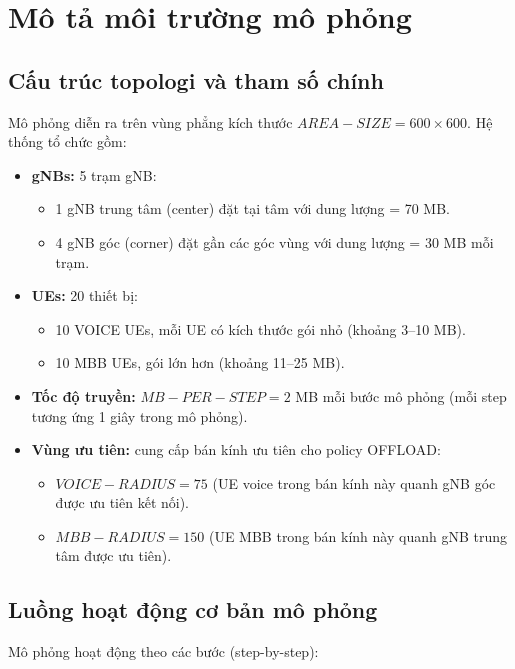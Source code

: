 \section{Mô tả môi trường mô phỏng}

\subsection{Cấu trúc topologi và tham số chính}

Mô phỏng diễn ra trên vùng phẳng kích thước $AREA-SIZE = 600 \times 600$. Hệ thống tổ chức gồm:

\begin{itemize}
\item \textbf{gNBs:} 5 trạm gNB:
\begin{itemize}
\item 1 gNB trung tâm (center) đặt tại tâm với dung lượng = 70 MB.
\item 4 gNB góc (corner) đặt gần các góc vùng với dung lượng = 30 MB mỗi trạm.
\end{itemize}
\item \textbf{UEs:} 20 thiết bị:
\begin{itemize}
\item 10 VOICE UEs, mỗi UE có kích thước gói nhỏ (khoảng 3–10 MB).
\item 10 MBB UEs, gói lớn hơn (khoảng 11–25 MB).
\end{itemize}
\item \textbf{Tốc độ truyền:} $MB-PER-STEP = 2$ MB mỗi bước mô phỏng (mỗi step tương ứng 1 giây trong mô phỏng).
\item \textbf{Vùng ưu tiên:} cung cấp bán kính ưu tiên cho policy OFFLOAD:
\begin{itemize}
\item $VOICE-RADIUS = 75$ (UE voice trong bán kính này quanh gNB góc được ưu tiên kết nối).
\item $MBB-RADIUS = 150$ (UE MBB trong bán kính này quanh gNB trung tâm được ưu tiên).
\end{itemize}
\end{itemize}

\subsection{Luồng hoạt động cơ bản mô phỏng}
Mô phỏng hoạt động theo các bước (step-by-step):


